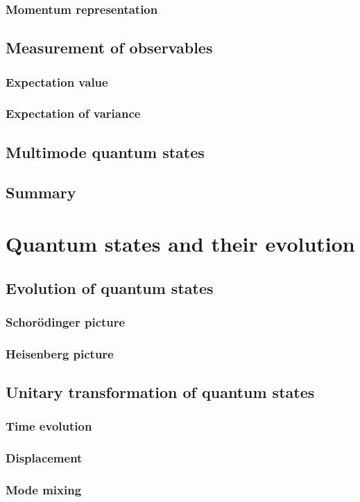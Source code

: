 \documentclass{book}
\begin{document}
\subsection{Momentum representation}
\section{Measurement of observables}
\subsection{Expectation value}
\subsection{Expectation of variance}
\section{Multimode quantum states}
\section{Summary}

\chapter{Quantum states and their evolution}
\section{Evolution of quantum states}
\subsection{Schor\"odinger picture}
\subsection{Heisenberg picture}
\section{Unitary transformation of quantum states}
\subsection{Time evolution}
\subsection{Displacement}
\subsection{Mode mixing}
\end{document}
